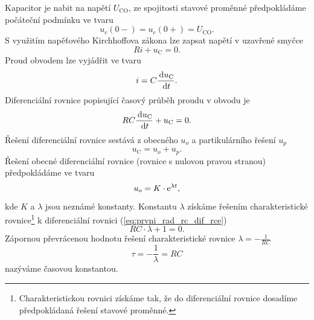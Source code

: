 Kapacitor je nabit na napětí $U_\mathrm{CO}$, ze spojitosti stavové proměnné předpokládáme počáteční podmínku ve tvaru
$$
u_c(0-) = u_c(0+) = U_\mathrm{CO}.
$$
S využitím napěťového Kirchhoffova zákona lze zapsat napětí v uzavřené smyčce 
$$
Ri + u_\mathrm{C} = 0.
$$
Proud obvodem lze vyjádřit ve tvaru 
$$
i = C \frac{\,\mathrm{d} u_\mathrm{C}}{\,\mathrm{d} t}.
$$
Diferenciální rovnice popisující časový průběh proudu v obvodu je
\begin{equation}
RC \frac{\,\mathrm{d} u_\mathrm{C}}{\,\mathrm{d} t} + u_\mathrm{C} = 0.
\label{eq:prvni_rad_rc_dif_rce}
\end{equation}
Řešení diferenciální rovnice sestává z obecného $u_o$ a partikulárního řešení $u_p$
$$
u_\mathrm{C} = u_o + u_p.
$$
Řešení obecné diferenciální rovnice (rovnice s nulovou pravou stranou) předpokládáme ve tvaru
$$
u_o = K \cdot \mathrm{e}^{\lambda t},
$$
kde $K$ a $\lambda$ jsou neznámé konstanty. Konstantu $\lambda$ získáme řešením charakteristické rovnice\footnote{Charakteristickou rovnici získáme tak, že do diferenciální rovnice dosadíme předpokládaná řešení stavové proměnné.} k diferenciální rovnici (\ref{eq:prvni_rad_rc_dif_rce})
$$
RC \cdot \lambda + 1 = 0.
$$
Zápornou převrácenou hodnotu řešení charakteristické rovnice $\lambda = - \frac{1}{RC}$
$$
\tau = - \frac{1}{\lambda} = RC
$$ 
nazýváme časovou konstantou. 

